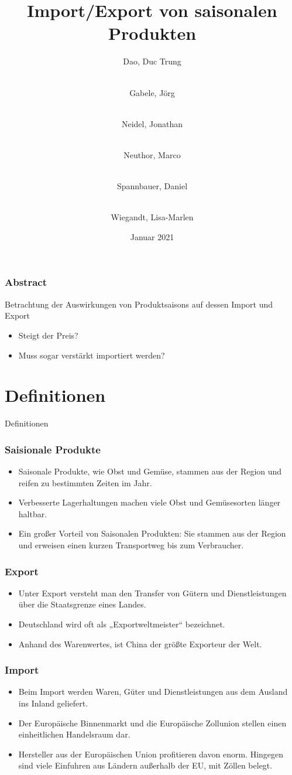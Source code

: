 \documentclass{beamer}
\title{Import/Export von saisonalen Produkten}
\author[Dao, Gabele, Neidel, Neuthor, Spannbauer, Wiegandt]{
  Dao, Duc Trung \and\\
  Gabele, Jörg \and\\
  Neidel, Jonathan \and\\
  Neuthor, Marco \and\\
  Spannbauer, Daniel \and\\
  Wiegandt, Lisa-Marlen
}
\date{Januar 2021}
\institute{HTW Berlin, Angewandte Informatik}
\begin{document}
\frame{\titlepage}

\begin{frame}
	\frametitle{Abstract}
	Betrachtung der Auswirkungen von Produktsaisons auf dessen Import und Export
	\begin{itemize}
		\item Steigt der Preis?
		\item Muss sogar verstärkt importiert werden?
	\end{itemize}
\end{frame}

\section{Definitionen} %
\begin{frame}
	\begin{center}
		{\Huge Definitionen}
	\end{center}
\end{frame}

\begin{frame}
\frametitle{Saisionale Produkte}
  \begin{itemize}
    \item Saisonale Produkte, wie Obst und Gemüse, stammen
      aus der Region und reifen zu bestimmten Zeiten im Jahr.
    \item  Verbesserte Lagerhaltungen machen viele Obst und
      Gemüsesorten länger haltbar.
    \item  Ein großer Vorteil von Saisonalen Produkten: Sie
      stammen aus der Region und erweisen einen kurzen
      Transportweg bis zum Verbraucher.
  \end{itemize}
\end{frame}

\begin{frame}
\frametitle{Export}
  \begin{itemize}
    \item
Unter Export versteht man den Transfer von Gütern und Dienstleistungen über
die Staatsgrenze eines Landes.
    \item
Deutschland wird oft als „Exportweltmeister“ bezeichnet.
    \item
Anhand des Warenwertes, ist China der größte Exporteur der Welt.
  \end{itemize}
\end{frame}

\begin{frame}
\frametitle{Import}
  \begin{itemize}
    \item Beim Import werden Waren, Güter und Dienstleistungen aus dem Ausland ins
      Inland geliefert.
    \item Der Europäische Binnenmarkt und die Europäische Zollunion stellen einen
      einheitlichen Handelsraum dar.
    \item Hersteller aus der Europäischen Union profitieren davon enorm. Hingegen sind
      viele Einfuhren aus Ländern außerhalb der EU, mit Zöllen belegt.
  \end{itemize}
\end{frame}
\end{document}
